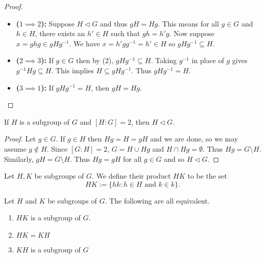 \documentclass[11pt]{article}
\begin{document}
\begin{proof}\,
\begin{itemize}
    \item\textbf{($1\implies 2$):} Suppose $H\lhd G$ and thus $gH=Hg$. This means for all $g\in G$ and $h\in H$, there exists an $h'\in H$ such that $gh=h'g$. Now suppose $x=ghg\in gHg^{-1}$. We have $x=h'gg^{-1}=h'\in H$ so $gHg^{-1}\subseteq H$.

    \item\textbf{($2\implies 3$):} If $g\in G$ then by (2), $gHg^{-1}\subseteq H$. Taking $g^{-1}$ in place of $g$ gives $g^{-1}Hg\subseteq H$. This implies $H\subseteq gHg^{-1}$. Thus $gHg^{-1}=H$.

    \item\textbf{($3\implies 1$):} If $gHg^{-1}=H$, then $gH=Hg$.
\end{itemize}
\end{proof}

\begin{proposition}
    If $H$ is a subgroup of $G$ and $[H:G]=2$, then $H\lhd G$.
\end{proposition}

\begin{proof}
    Let $g\in G$. If $g\in H$ then $Hg=H=gH$ and we are done, so we may assume $g\not\in H$. Since $[G:H]=2$, $G=H\cup Hg$ and $H\cap Hg=\emptyset$. Thus $Hg=G\setminus H$. Similarly, $gH=G\setminus H$. Thus $Hg=gH$ for all $g\in G$ and so $H\lhd G$.
\end{proof}

\begin{definition}
    Let $H,K$ be subgroups of $G$. We define their product $HK$ to be the set
    \[HK:=\{hk:h\in H\text{ and }k\in k\}.\]
\end{definition}

\begin{proposition}
    Let $H$ and $K$ be subgroups of $G$. The following are all equivalent.
    \begin{enumerate}
        \item $HK$ is a subgroup of $G$.
        \item $HK=KH$
        \item $KH$ is a subgroup of $G$
    \end{enumerate}
\end{proposition}
\end{document}
